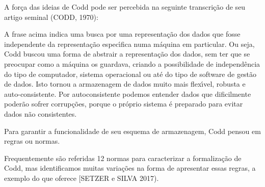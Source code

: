 \documentclass[
12pt,		%
openright,	%
twoside,  %
a4paper,			%
chapter=TITLE,		%
english,			%
french,				%
spanish,			%
brazil				%
]{USPSC-classe/USPSC}
\begin{document}
A for\c{c}a das ideias de Codd pode ser percebida na seguinte transcri\c{c}\~ao de seu artigo seminal (CODD, 1970):










\noindent\begin{center}\mbox{\centering{}}\end{center}


A frase acima indica uma busca por uma representa\c{c}\~ao dos dados que fosse independente da representa\c{c}\~ao espec\'{\i}fica numa m\'aquina em particular. Ou seja, Codd buscou uma forma de abstrair a representa\c{c}\~ao dos dados, sem ter que se preocupar como a m\'aquina os guardava, criando a possibilidade de independ\^encia do tipo de computador, sistema operacional ou at\'e do tipo de software de gest\~ao de dados. Isto tornou a armazenagem de dados muito mais flex\'{\i}vel, robusta e auto-consistente. Por autoconsistente podemos entender dados que dificilmente poder\~ao sofrer corrup\c{c}\~oes, porque o pr\'oprio sistema \'e preparado para evitar dados n\~ao consistentes.









Para garantir a funcionalidade de seu esquema de armazenagem, Codd pensou em \textquotedbl  regras \textquotedbl  ou normas.









Frequentemente s\~ao referidas 12 normas para caracterizar a formaliza\c{c}\~ao de Codd, mas identificamos muitas varia\c{c}\~oes na forma de apresentar essas regras, a exemplo do que oferece [SETZER e SILVA 2017).
\end{document}
